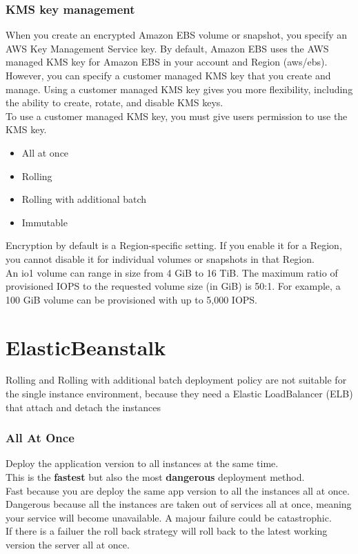\documentclass[12pt, letterpaper, twoside]{article}
\begin{document}
\subsubsection{KMS key management}
When you create an encrypted Amazon EBS volume or snapshot, you specify an AWS Key Management Service key. By default, Amazon EBS uses the 
AWS managed KMS key for Amazon EBS in your account and Region (aws/ebs). However, you can specify a customer managed KMS key that you create 
and manage. Using a customer managed KMS key gives you more flexibility, including the ability to create, rotate, and disable KMS keys.\\

To use a customer managed KMS key, you must give users permission to use the KMS key.

\begin{itemize}
	\item All at once 
	\item Rolling 
	\item Rolling  with additional batch
	\item Immutable
\end{itemize}

Encryption by default is a Region-specific setting. If you enable it for a Region, you cannot disable it for individual volumes 
or snapshots in that Region.\\

An io1 volume can range in size from 4 GiB to 16 TiB. The maximum ratio of provisioned IOPS to the requested volume size (in GiB) is 50:1. 
For example, a 100 GiB volume can be provisioned with up to 5,000 IOPS.

\section{ElasticBeanstalk}
Rolling and Rolling with additional batch deployment policy are not suitable for the single
instance environment, because they need a Elastic LoadBalancer (ELB) that attach and detach 
the instances\\

\subsubsection{All At Once}
Deploy the application version to all instances at the same time.\\
This is the \textbf{fastest} but also the most \textbf{dangerous} deployment method.\\
Fast because you are deploy the same app version to all the instances all at once.\\
Dangerous because all the instances are taken out of services all at once, meaning your service
will become unavailable. A majour failure could be catastrophic.\\
If there is a failuer the roll back strategy will roll back to the latest working version the 
server all at once.\\
\end{document}
